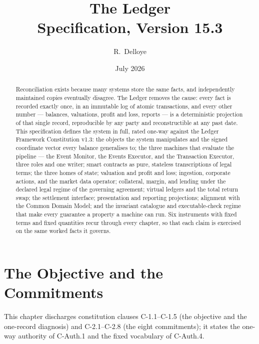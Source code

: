 \documentclass[11pt,a4paper]{article}
\title{The Ledger\\[6pt]
\large Specification, Version 15.3}
\author{R.\ Delloye}
\date{July 2026}
\begin{document}
\maketitle

\begingroup
\setlength{\parskip}{0pt}
\tableofcontents
\endgroup
\clearpage


\begin{abstract}
Reconciliation exists because many systems store the same facts, and independently
maintained copies eventually disagree. The Ledger removes the cause: every fact is
recorded exactly once, in an immutable log of atomic transactions, and every other
number --- balances, valuations, profit and loss, reports --- is a deterministic
projection of that single record, reproducible by any party and reconstructible at any
past date. This specification defines the system in full, rated one-way against the
Ledger Framework Constitution v1.3: the objects the system manipulates and the signed
coordinate vector every balance generalises to; the three machines that evaluate the
pipeline --- the Event Monitor, the Events Executor, and the Transaction Executor,
three roles and one writer; smart contracts as pure, stateless transcriptions of legal
terms; the three homes of state; valuation and profit and loss; ingestion, corporate
actions, and the market data operator; collateral, margin, and lending under the
declared legal regime of the governing agreement; virtual ledgers and the total return
swap; the settlement interface; presentation and reporting projections; alignment with
the Common Domain Model; and the invariant catalogue and executable-check regime that
make every guarantee a property a machine can run. Six instruments with fixed terms
and fixed quantities recur through every chapter, so that each claim is exercised on
the same worked facts it governs.
\end{abstract}

\tableofcontents
\clearpage

\section{The Objective and the Commitments}\label{ch:objective}

This chapter discharges constitution clauses C-1.1--C-1.5 (the objective and the one-record diagnosis) and C-2.1--C-2.8 (the eight commitments); it states the one-way authority of C-Auth.1 and the fixed vocabulary of C-Auth.4.
\end{document}
